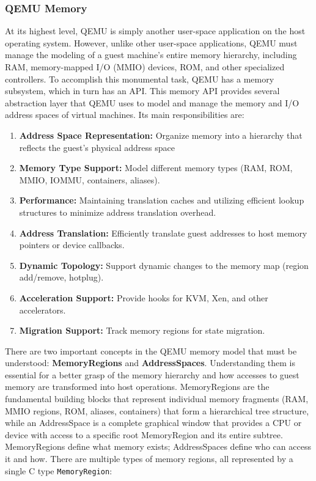 \subsubsection{QEMU Memory}
\label{chap:qemu_memory}

At its highest level, QEMU is simply another user-space application on the host 
operating system. However, unlike other user-space applications, QEMU must 
manage the modeling of a guest machine's entire memory hierarchy, including RAM, 
memory-mapped I/O (MMIO) devices, ROM, and other specialized controllers. To 
accomplish this monumental task, QEMU has a memory subsystem, which in turn 
has an API. This memory API provides several abstraction layer that QEMU uses to model 
and manage the memory and I/O address spaces of virtual machines. Its main 
responsibilities are:

\begin{enumerate}
    \item \textbf{Address Space Representation:} 
        Organize memory into a hierarchy that reflects the guest's physical address space
    \item \textbf{Memory Type Support:    }
        Model different memory types (RAM, ROM, MMIO, IOMMU, containers, aliases).
    \item \textbf{Performance:            }
        Maintaining translation caches and utilizing efficient lookup structures to minimize address translation overhead.
    \item \textbf{Address Translation:    }
        Efficiently translate guest addresses to host memory pointers or device callbacks.
    \item \textbf{Dynamic Topology:       }
        Support dynamic changes to the memory map (region add/remove, hotplug).
    \item \textbf{Acceleration Support:   }
        Provide hooks for KVM, Xen, and other accelerators.
    \item \textbf{Migration Support:      }
        Track memory regions for state migration. 
\end{enumerate}


There are two important concepts in the QEMU memory model that must be 
understood: \textbf{MemoryRegions} and \textbf{AddressSpaces}. Understanding them is essential 
for a better grasp of the memory hierarchy and how accesses to guest memory are 
transformed into host operations. MemoryRegions are the fundamental building 
blocks that represent individual memory fragments (RAM, MMIO regions, ROM, 
aliases, containers) that form a hierarchical tree structure, while an AddressSpace is 
a complete graphical window that provides a CPU or device with access to a specific 
root MemoryRegion and its entire subtree. MemoryRegions define what memory exists; 
AddressSpaces define who can access it and how. There are multiple types of memory regions, all represented by a 
single C type \texttt{MemoryRegion}\cite{Qemu_MMIO_Ops}:

